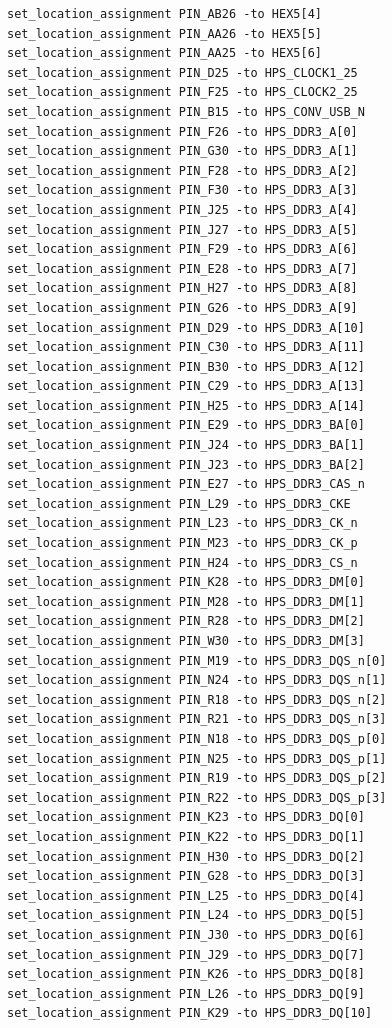 \documentclass[conference]{IEEEtran}
\begin{document}
\begin{lstlisting}
set_location_assignment PIN_AB26 -to HEX5[4]
set_location_assignment PIN_AA26 -to HEX5[5]
set_location_assignment PIN_AA25 -to HEX5[6]
set_location_assignment PIN_D25 -to HPS_CLOCK1_25
set_location_assignment PIN_F25 -to HPS_CLOCK2_25
set_location_assignment PIN_B15 -to HPS_CONV_USB_N
set_location_assignment PIN_F26 -to HPS_DDR3_A[0]
set_location_assignment PIN_G30 -to HPS_DDR3_A[1]
set_location_assignment PIN_F28 -to HPS_DDR3_A[2]
set_location_assignment PIN_F30 -to HPS_DDR3_A[3]
set_location_assignment PIN_J25 -to HPS_DDR3_A[4]
set_location_assignment PIN_J27 -to HPS_DDR3_A[5]
set_location_assignment PIN_F29 -to HPS_DDR3_A[6]
set_location_assignment PIN_E28 -to HPS_DDR3_A[7]
set_location_assignment PIN_H27 -to HPS_DDR3_A[8]
set_location_assignment PIN_G26 -to HPS_DDR3_A[9]
set_location_assignment PIN_D29 -to HPS_DDR3_A[10]
set_location_assignment PIN_C30 -to HPS_DDR3_A[11]
set_location_assignment PIN_B30 -to HPS_DDR3_A[12]
set_location_assignment PIN_C29 -to HPS_DDR3_A[13]
set_location_assignment PIN_H25 -to HPS_DDR3_A[14]
set_location_assignment PIN_E29 -to HPS_DDR3_BA[0]
set_location_assignment PIN_J24 -to HPS_DDR3_BA[1]
set_location_assignment PIN_J23 -to HPS_DDR3_BA[2]
set_location_assignment PIN_E27 -to HPS_DDR3_CAS_n
set_location_assignment PIN_L29 -to HPS_DDR3_CKE
set_location_assignment PIN_L23 -to HPS_DDR3_CK_n
set_location_assignment PIN_M23 -to HPS_DDR3_CK_p
set_location_assignment PIN_H24 -to HPS_DDR3_CS_n
set_location_assignment PIN_K28 -to HPS_DDR3_DM[0]
set_location_assignment PIN_M28 -to HPS_DDR3_DM[1]
set_location_assignment PIN_R28 -to HPS_DDR3_DM[2]
set_location_assignment PIN_W30 -to HPS_DDR3_DM[3]
set_location_assignment PIN_M19 -to HPS_DDR3_DQS_n[0]
set_location_assignment PIN_N24 -to HPS_DDR3_DQS_n[1]
set_location_assignment PIN_R18 -to HPS_DDR3_DQS_n[2]
set_location_assignment PIN_R21 -to HPS_DDR3_DQS_n[3]
set_location_assignment PIN_N18 -to HPS_DDR3_DQS_p[0]
set_location_assignment PIN_N25 -to HPS_DDR3_DQS_p[1]
set_location_assignment PIN_R19 -to HPS_DDR3_DQS_p[2]
set_location_assignment PIN_R22 -to HPS_DDR3_DQS_p[3]
set_location_assignment PIN_K23 -to HPS_DDR3_DQ[0]
set_location_assignment PIN_K22 -to HPS_DDR3_DQ[1]
set_location_assignment PIN_H30 -to HPS_DDR3_DQ[2]
set_location_assignment PIN_G28 -to HPS_DDR3_DQ[3]
set_location_assignment PIN_L25 -to HPS_DDR3_DQ[4]
set_location_assignment PIN_L24 -to HPS_DDR3_DQ[5]
set_location_assignment PIN_J30 -to HPS_DDR3_DQ[6]
set_location_assignment PIN_J29 -to HPS_DDR3_DQ[7]
set_location_assignment PIN_K26 -to HPS_DDR3_DQ[8]
set_location_assignment PIN_L26 -to HPS_DDR3_DQ[9]
set_location_assignment PIN_K29 -to HPS_DDR3_DQ[10]

\end{lstlisting}
\end{document}
